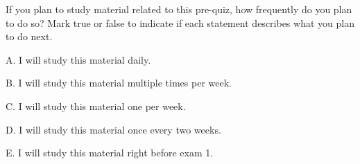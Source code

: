 \documentclass{ximera}
\begin{document}
\begin{question}

If you plan to study material related to this pre-quiz, how frequently do you plan to do so?  Mark true or false to indicate if each statement describes what you plan to do next.

\vspace{1 in}

\begin{question}

    A. I will study this material daily. 

    \begin{multipleChoice}
    \end{multipleChoice}
    
\end{question}
\begin{question}
    
    B. I will study this material multiple times per week.
    
    \begin{multipleChoice}
    \end{multipleChoice}
    
\end{question}
\begin{question}
    
    C. I will study this material one per week. 

    \begin{multipleChoice}
    \end{multipleChoice}
    
\end{question}
\begin{question}
    
    D. I will study this material once every two weeks. 

    \begin{multipleChoice}
    \end{multipleChoice}
    
\end{question}
\begin{question}
    
    E. I will study this material right before exam 1. 

    \begin{multipleChoice}
    \end{multipleChoice}
    

\end{question}
\end{question}
\end{document}
